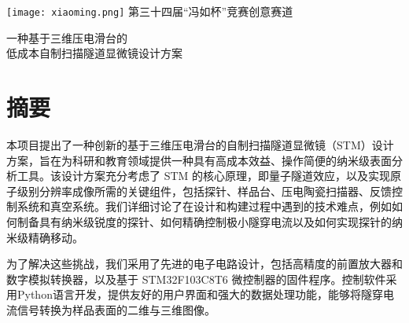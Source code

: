 \documentclass{article}
\begin{document}
\begin{titlepage}
	\vspace{32pt}
	\begin{center}
		\texttt{[image: xiaoming.png]}
		\vskip 6pt
		\xiaoer
		\zhongsong
		第三十四届“冯如杯”竞赛创意赛道
	\end{center}
	\vspace{12pt}
	\begin{spacing}{3}
		\begin{center}
			\erhao
			\zhongsong
			一种基于三维压电滑台的\\低成本自制扫描隧道显微镜设计方案
		\end{center}
	\end{spacing}
	
\end{titlepage}



\clearpage
\renewcommand{\headrulewidth}{0pt}	%

\xiaosi	%


\section*{摘要}
本项目提出了一种创新的基于三维压电滑台的自制扫描隧道显微镜（STM）设计方案，旨在为科研和教育领域提供一种具有高成本效益、操作简便的纳米级表面分析工具。该设计方案充分考虑了 STM 的核心原理，即量子隧道效应，以及实现原子级别分辨率成像所需的关键组件，包括探针、样品台、压电陶瓷扫描器、反馈控制系统和真空系统。我们详细讨论了在设计和构建过程中遇到的技术难点，例如如何制备具有纳米级锐度的探针、如何精确控制极小隧穿电流以及如何实现探针的纳米级精确移动。

为了解决这些挑战，我们采用了先进的电子电路设计，包括高精度的前置放大器和数字模拟转换器，以及基于 STM32F103C8T6 微控制器的固件程序。控制软件采用Python语言开发，提供友好的用户界面和强大的数据处理功能，能够将隧穿电流信号转换为样品表面的二维与三维图像。
\end{document}
